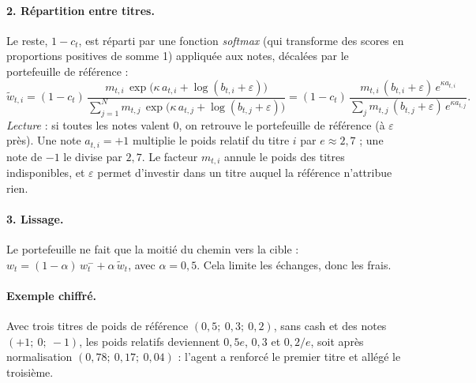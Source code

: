 \documentclass[11pt,a4paper]{article}
\begin{document}
\paragraph{2. Répartition entre titres.} Le reste, \(1-c_t\), est réparti par une fonction \emph{softmax}
(qui transforme des scores en proportions positives de somme 1) appliquée aux notes, décalées par le portefeuille
de référence :
\begin{equation}
  \tilde w_{t,i}=(1-c_t)\,\frac{m_{t,i}\,\exp\!\big(\kappa\,a_{t,i}+\log(b_{t,i}+\varepsilon)\big)}
  {\sum_{j=1}^{N} m_{t,j}\,\exp\!\big(\kappa\,a_{t,j}+\log(b_{t,j}+\varepsilon)\big)}
  =(1-c_t)\,\frac{m_{t,i}\,(b_{t,i}+\varepsilon)\,e^{\kappa a_{t,i}}}{\sum_{j} m_{t,j}\,(b_{t,j}+\varepsilon)\,e^{\kappa a_{t,j}}}.
\end{equation}
\emph{Lecture} : si toutes les notes valent 0, on retrouve le portefeuille de référence (à \(\varepsilon\) près).
Une note \(a_{t,i}=+1\) multiplie le poids relatif du titre \(i\) par \(e\approx2{,}7\) ; une note de \(-1\) le divise
par \(2{,}7\). Le facteur \(m_{t,i}\) annule le poids des titres indisponibles, et \(\varepsilon\) permet d'investir
dans un titre auquel la référence n'attribue rien.

\paragraph{3. Lissage.} Le portefeuille ne fait que la moitié du chemin vers la cible :
\(w_t=(1-\alpha)\,w^{-}_t+\alpha\,\tilde w_t\), avec \(\alpha=0{,}5\). Cela limite les échanges, donc les frais.

\paragraph{Exemple chiffré.} Avec trois titres de poids de référence \((0{,}5;\ 0{,}3;\ 0{,}2)\), sans cash et des
notes \((+1;\ 0;\ -1)\), les poids relatifs deviennent \(0{,}5e\), \(0{,}3\) et \(0{,}2/e\), soit après normalisation
\((0{,}78;\ 0{,}17;\ 0{,}04)\) : l'agent a renforcé le premier titre et allégé le troisième.
\end{document}
